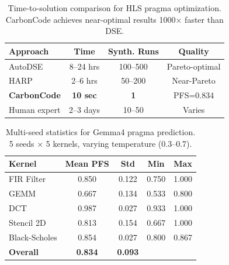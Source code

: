 \begin{table}[t]
\centering
\caption{Time-to-solution comparison for HLS pragma optimization.
CarbonCode achieves near-optimal results 1000$\times$ faster than DSE.}
\label{tab:time}
\begin{tabular}{lccc}
\toprule
\textbf{Approach} & \textbf{Time} & \textbf{Synth. Runs} & \textbf{Quality} \\
\midrule
AutoDSE~\cite{autodse}  & 8--24 hrs & 100--500 & Pareto-optimal \\
HARP~\cite{harp}         & 2--6 hrs  & 50--200  & Near-Pareto \\
\textbf{CarbonCode}      & \textbf{10 sec} & \textbf{1} & PFS=0.834 \\
Human expert              & 2--3 days & 10--50   & Varies \\
\bottomrule
\end{tabular}
\end{table}

\begin{table}[t]
\centering
\caption{Multi-seed statistics for Gemma4 pragma prediction.
5 seeds $\times$ 5 kernels, varying temperature (0.3--0.7).}
\label{tab:stats}
\begin{tabular}{lcccc}
\toprule
\textbf{Kernel} & \textbf{Mean PFS} & \textbf{Std} & \textbf{Min} & \textbf{Max} \\
\midrule
FIR Filter      & 0.850 & 0.122 & 0.750 & 1.000 \\
GEMM            & 0.667 & 0.134 & 0.533 & 0.800 \\
DCT             & 0.987 & 0.027 & 0.933 & 1.000 \\
Stencil 2D      & 0.813 & 0.154 & 0.667 & 1.000 \\
Black-Scholes   & 0.854 & 0.027 & 0.800 & 0.867 \\
\midrule
\textbf{Overall} & \textbf{0.834} & \textbf{0.093} & & \\
\bottomrule
\end{tabular}
\end{table}
